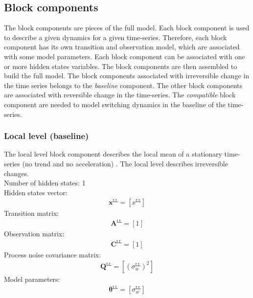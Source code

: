 \subsection{Block components}
\label{SS:BlockComponent}
The block components are pieces of the full model.
Each block component is used to describe a given dynamics for a given time-series.
Therefore, each block component has its own transition and observation model, which are associated with some model parameters.
Each block component can be associated with one or more hidden states variables.
The block components are then assembled to build the full model.
The block components associated with irreversible change in the time series belongs to the \emph{baseline} component.
The other block components are associated with reversible change in the time-series.
The \emph{compatible} block component are needed to model switching dynamics in the baseline of the time-series.

\subsubsection{Local level (baseline)}

The local level block component describes the local mean of a stationary time-series (no trend and no acceleration) \cite{STC:STC2035}. 
The local level describes irreversible changes.\\

\noindent
Number of hidden states: 1\\

Hidden states vector: 
\begin{gather*}
\mathbf{x}^{\mathtt{LL}} = [x^{\mathtt{LL}}]
\end{gather*}
Transition matrix: 
\begin{gather*}
\mathbf{A}^{\mathtt{LL}}=[1]
\end{gather*}
Observation matrix: 
\begin{gather*}
\mathbf{C}^{\mathtt{LL}}=[1]
\end{gather*}
Process noise covariance matrix: 
\begin{gather*}
\mathbf{Q}^{\mathtt{LL}}=[(\sigma_{w}^{\mathtt{LL}})^{2}]
\end{gather*}
Model parameters: 
\begin{gather*}
\bm\theta^{\mathtt{LL}}=[\sigma_{w}^{\mathtt{LL}} ]
\end{gather*}

